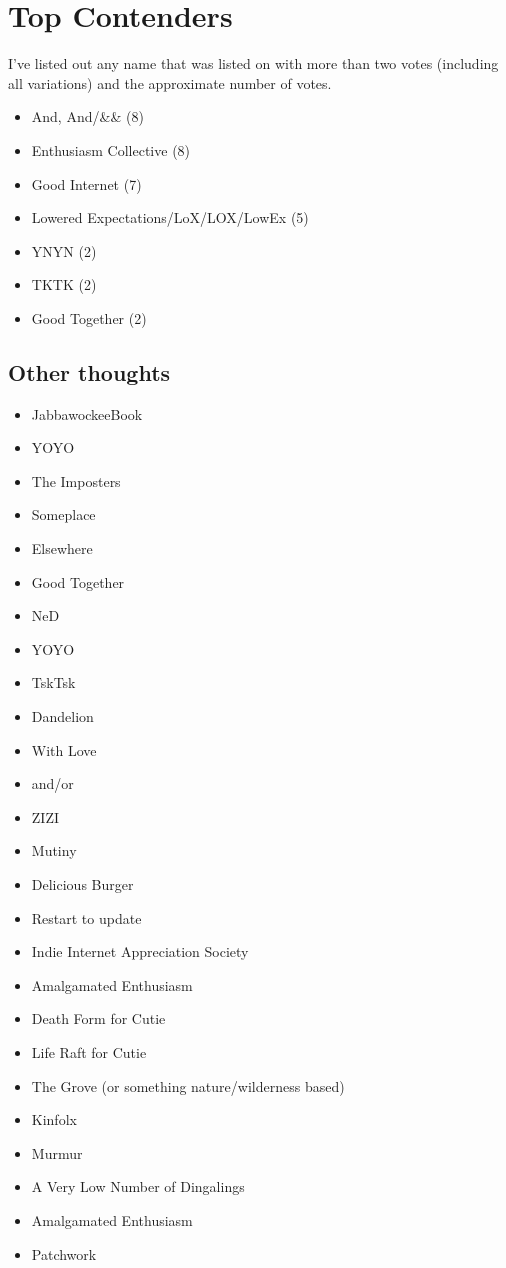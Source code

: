 \documentclass[
]{book}
\providecommand{\tightlist}{%
  \setlength{\itemsep}{0pt}\setlength{\parskip}{0pt}}
\begin{document}
\section{Top Contenders}\label{top-contenders}

I've listed out any name that was listed on with more than two votes (including all variations) and the approximate number of votes.

\begin{itemize}
\tightlist
\item
  And, And/\&\& (8)
\item
  Enthusiasm Collective (8)
\item
  Good Internet (7)
\item
  Lowered Expectations/LoX/LOX/LowEx (5)
\item
  YNYN (2)
\item
  TKTK (2)
\item
  Good Together (2)
\end{itemize}

\subsection{Other thoughts}\label{other-thoughts}

\begin{itemize}
\tightlist
\item
  JabbawockeeBook
\item
  YOYO
\item
  The Imposters
\item
  Someplace
\item
  Elsewhere
\item
  Good Together
\item
  NeD
\item
  YOYO
\item
  TskTsk
\item
  Dandelion
\item
  With Love
\item
  and/or
\item
  ZIZI
\item
  Mutiny
\item
  Delicious Burger
\item
  Restart to update
\item
  Indie Internet Appreciation Society
\item
  Amalgamated Enthusiasm
\item
  Death Form for Cutie
\item
  Life Raft for Cutie
\item
  The Grove (or something nature/wilderness based)
\item
  Kinfolx
\item
  Murmur
\item
  A Very Low Number of Dingalings
\item
  Amalgamated Enthusiasm
\item
  Patchwork
\end{itemize}
\end{document}
